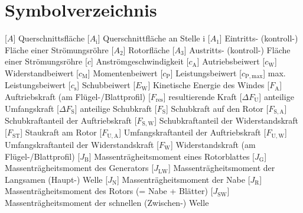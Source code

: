 \documentclass[
	pagesize,
	fontsize=12pt,
	paper=a4,
	oneside,
   reqno
]{scrartcl}
\numberwithin{equation}{section} %
\numberwithin{table}{section} %
\numberwithin{figure}{section} %
\begin{document}
\section*{Symbolverzeichnis}
\begin{acronym}[Symbols]
            [$A$]                       {Querschnittsfläche}
           [$A_{\mathrm{i}}$]          {Querschnittfläche an Stelle i}    
           [$A_{\mathrm{1}}$]          {Eintritts- (kontroll-) Fläche einer Strömungsröhre}
           [$A_{\mathrm{2}}$]          {Rotorfläche}
           [$A_{\mathrm{3}}$]          {Austritts- (kontroll-) Fläche einer Strömungsröhre}
            [$c$]                       {Anströmgeschwindigkeit}
           [$c_{\mathrm{A}}$]          {Autriebsbeiwert}
           [$c_{\mathrm{W}}$]          {Widerstandbeiwert}
           [$c_{\mathrm{M}}$]          {Momentenbeiwert}
           [$c_{\mathrm{P}}$]          {Leistungsbeiwert}
        [$c_{\mathrm{P,max}}$]      {max. Leistungsbeiwert}
           [$c_{\mathrm{s}}$]          {Schubbeiwert}
           [$E_{\mathrm{W}}$]          {Kinetische Energie des Windes}
           [$F_{\mathrm{A}}$]          {Auftriebskraft (am Flügel-/Blattprofil)}
         [$F_{\mathrm{res}}$]        {resultierende Kraft}
      [$\Delta F_{\mathrm{U}}$]   {anteilige Umfangskraft}
      [$\Delta F_{\mathrm{S}}$]   {anteilige Schubkraft}
           [$F_{\mathrm{S}}$]          {Schubkraft auf den Rotor}
          [$F_{\mathrm{S,A}}$]        {Schubkraftanteil der Auftriebskraft}
          [$F_{\mathrm{S,W}}$]        {Schubkraftanteil der Widerstandskraft}
          [$F_{\mathrm{ST}}$]         {Staukraft am Rotor}
          [$F_{\mathrm{U,A}}$]        {Umfangskraftanteil der Auftriebskraft}
          [$F_{\mathrm{U,W}}$]        {Umfangskraftanteil der Widerstandskraft}
           [$F_{\mathrm{W}}$]          {Widerstandskraft (am Flügel-/Blattprofil)}
           [$J_{\mathrm{B}}$]          {Massenträgheitsmoment eines Rotorblattes}
           [$J_{\mathrm{G}}$]          {Massenträgheitsmoment des Generators}
          [$J_{\mathrm{LW}}$]         {Massenträgheitsmoment der Langsamen (Haupt-) Welle}
           [$J_{\mathrm{N}}$]          {Massenträgheitsmoment der Nabe}
           [$J_{\mathrm{R}}$]          {Massenträgheitsmoment des Rotors (= Nabe + Blätter)}
          [$J_{\mathrm{SW}}$]         {Massenträgheitsmoment der schnellen (Zwischen-) Welle}

\end{acronym}
\end{document}
